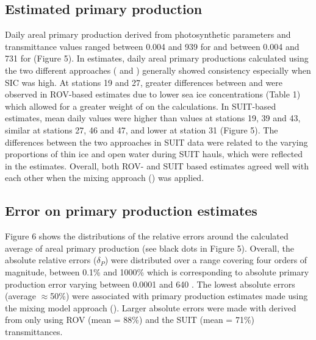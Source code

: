 \subsection{Estimated primary production}

Daily areal primary production derived from photosynthetic parameters and transmittance values ranged between 0.004 and 939 \dailypp{} for \ppunderice{} and between 0.004 and 731 \dailypp{} for \ppmixing{} (Figure 5). In \DIFdelbegin {}\DIFdelend \DIFaddbegin {}\DIFaddend estimates, daily areal primary productions calculated using the two different approaches (\ppunderice{} and \ppmixing{}) generally showed consistency especially when SIC was high. At stations 19 and 27, greater differences between \ppunderice{} and \ppmixing{} were observed in ROV-based estimates due to lower sea ice concentrations (Table 1) which allowed for a greater weight of \ppopenwater{} on the calculations. In SUIT-based estimates, mean daily \ppunderice{} values were higher than \ppmixing{} values at stations 19, 39 and 43, similar \DIFdelbegin {}\DIFdelend at stations 27, 46 and 47, and lower \DIFdelbegin {}\DIFdelend at station 31 (Figure 5). The \DIFaddbegin {}\ppunderice{} \DIFaddend differences between the two approaches in SUIT data were related to the varying proportions of thin ice and open water during SUIT hauls, which were reflected in the \ppunderice{} estimates. Overall, both ROV- and SUIT based estimates agreed well with each other when the mixing approach (\ppmixing{}) was applied.

\subsection{Error on primary production estimates}

Figure 6 shows the distributions of the relative errors around the calculated average of areal primary production (see black dots in Figure 5). Overall, the absolute relative errors ($\delta_P$) were distributed over a range covering four orders of magnitude, between 0.1\% and 1000\% which is corresponding to absolute primary production error varying between 0.0001 and 640 \dailypp{}. The lowest absolute errors (average $\approx$50\%) were associated with primary production estimates made using the mixing model approach (\ppmixing{}). Larger absolute errors were made with \ppunderice{} derived from only using ROV (mean = 88\%) and the SUIT (mean = 71\%) transmittances.

